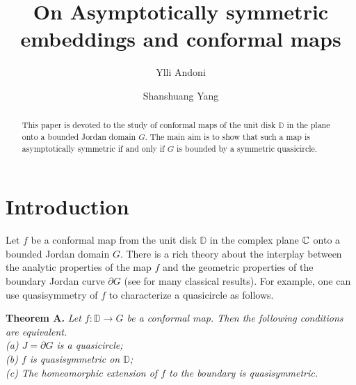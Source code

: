 \documentclass[11pt]{amsart}
\numberwithin{equation}{section}
\theoremstyle{plain}
\theoremstyle{step}
\newcommand{\D}{\mathbb{D}}
\newcommand{\C}{\Bbb{C}}
\begin{document}
\title
{On Asymptotically symmetric embeddings and conformal maps}
\author{Ylli Andoni}
\address{ Department of Mathematics, Emory University, Atlanta, GA, 30322 USA}

\author{Shanshuang Yang}
\address{ Department of Mathematics, Emory University, Atlanta, GA, 30322 USA}

\begin{abstract}
This paper is devoted to the study of conformal maps of the unit disk $\D$ in the plane onto a bounded Jordan domain $G$. The main aim is to show that such a map is asymptotically symmetric if and only if $G$ is bounded by a symmetric quasicircle.
\end{abstract}
\maketitle


\section{Introduction}
Let $f$ be a conformal map from the unit disk $\D$ in the complex plane $\C$ onto a bounded Jordan domain $G$. There is a rich theory about the interplay between the analytic properties of the map $f$ and the geometric properties of the boundary Jordan curve $\partial G$ (see \cite{pommerenke2013boundary} for many classical results). For example, one can use quasisymmetry of $f$ to characterize a quasicircle as follows.

\vspace{0.5cm}
{\bf Theorem A.} {\it Let $f: \D\rightarrow G$ be a conformal map. Then the following conditions are equivalent.\\
(a) $J=\partial G$ is a quasicircle;\\
(b) $f$ is quasisymmetric on $\D$;\\
(c) The homeomorphic extension of $f$ to the boundary is quasisymmetric.}
\end{document}
